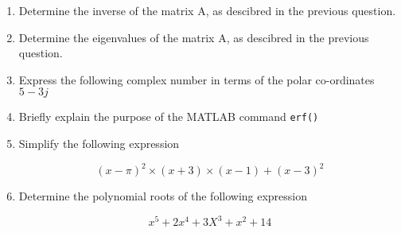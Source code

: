 \documentclass[12pt]{article}
\begin{document}
\begin{enumerate}
\item Determine the inverse of the matrix A, as descibred in the previous question.

\item Determine the eigenvalues of the matrix A, as descibred in the previous question.

\item Express the following complex number in terms of the polar co-ordinates $5-3j$

\item Briefly explain the purpose of the MATLAB command \texttt{erf()}

\item Simplify the following expression

 \[ (x-\pi)^2 \times (x+3) \times (x-1) + (x-3)^2 \]

\item Determine the polynomial roots of the following expression

 \[ x^5 + 2x^4 + 3X^3+ x^2 + 14 \]

\end{enumerate}
\end{document}
